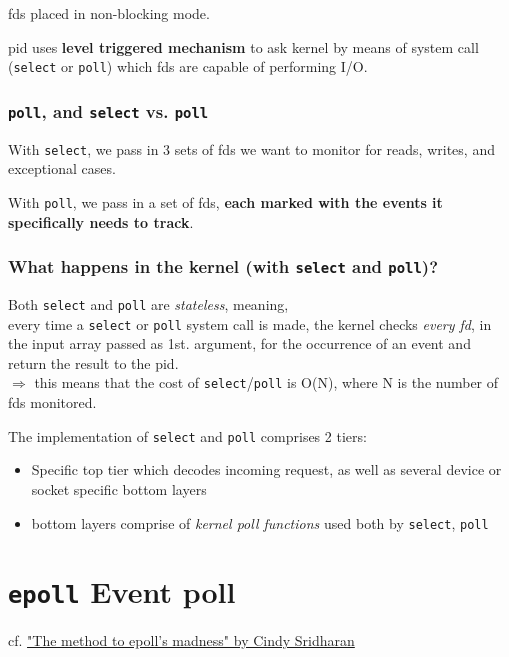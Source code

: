\documentclass[10pt]{amsart}
\begin{document}
fds placed in non-blocking mode.

pid uses \textbf{level triggered mechanism} to ask kernel by means of system call (\texttt{select} or \texttt{poll}) which fds are capable of performing I/O. 

\subsubsection{\texttt{poll}, and \texttt{select} vs. \texttt{poll} }

With \texttt{select}, we pass in 3 sets of fds we want to monitor for reads, writes, and exceptional cases.

With \texttt{poll}, we pass in a set of fds, \textbf{each marked with the events it specifically needs to track}.

\subsubsection{What happens in the kernel (with \texttt{select} and \texttt{poll})?}

Both \texttt{select} and \texttt{poll} are \emph{stateless}, meaning, \\
every time a \texttt{select} or \texttt{poll} system call is made, the kernel checks \emph{every fd}, in the input array passed as 1st. argument, for the occurrence of an event and return the result to the pid. \\
$\Longrightarrow$ this means that the cost of \texttt{select}/\texttt{poll} is O(N), where N is the number of fds monitored.

The implementation of \texttt{select} and \texttt{poll} comprises 2 tiers:
\begin{itemize}
	\item Specific top tier which decodes incoming request, as well as several device or socket specific bottom layers
	\item bottom layers comprise of \emph{kernel poll functions} used both by \texttt{select}, \texttt{poll}
\end{itemize}

\section{\texttt{epoll} Event poll}

cf. \href{https://medium.com/@copyconstruct/the-method-to-epolls-madness-d9d2d6378642}{"The method to epoll's madness" by Cindy Sridharan}\cite{Srid2017}
\end{document}
